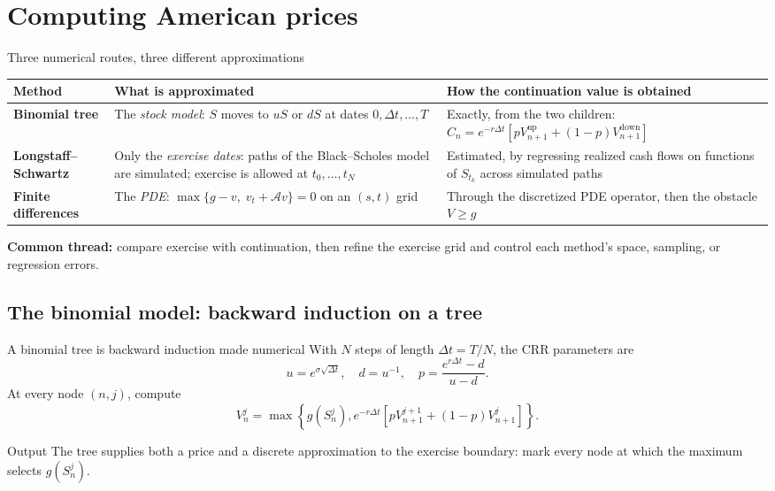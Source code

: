 \documentclass[handout,10pt,aspectratio=169]{beamer}
\begin{document}
\section{Computing American prices}

\begin{frame}{Three numerical routes, three different approximations}
\small
\begin{center}
\renewcommand{\arraystretch}{1.15}
\begin{tabular}{>{\raggedright\arraybackslash}p{}
                >{\raggedright\arraybackslash}p{}
                >{\raggedright\arraybackslash}p{}}
\toprule
Method & What is approximated & How the continuation value is obtained\\
\midrule
\textbf{Binomial tree}
  & The \emph{stock model}: \(S\) moves to \(uS\) or \(dS\) at dates
    \(0,\Delta t,\ldots,T\)
  & Exactly, from the two children:
    \(C_n=e^{-r\Delta t}[pV_{n+1}^{\mathrm{up}}+(1-p)V_{n+1}^{\mathrm{down}}]\)\\
\midrule
\textbf{Longstaff--Schwartz}
  & Only the \emph{exercise dates}: paths of the Black--Scholes model are
    simulated; exercise is allowed at \(t_0,\ldots,t_N\)
  & Estimated, by regressing realized cash flows on functions of \(S_{t_k}\)
    across simulated paths\\
\midrule
\textbf{Finite differences}
  & The \emph{PDE}: \(\max\{g-v,\;v_t+\mathcal Av\}=0\) on an \((s,t)\) grid
  & Through the discretized PDE operator, then the obstacle \(V\geq g\)\\
\bottomrule
\end{tabular}
\end{center}
\textbf{Common thread:} compare exercise with continuation, then refine
the exercise grid and control each method's space, sampling, or regression errors.
\end{frame}

\subsection{The binomial model: backward induction on a tree}

\begin{frame}{A binomial tree is backward induction made numerical}
With \(N\) steps of length \(\Delta t=T/N\), the CRR parameters are
\[
u=e^{\sigma\sqrt{\Delta t}},\quad d=u^{-1},\quad
p=\frac{e^{r\Delta t}-d}{u-d}.
\]
At every node \((n,j)\), compute
\[
\boxed{V_n^j=\max\left\{g(S_n^j),e^{-r\Delta t}
\left[pV_{n+1}^{j+1}+(1-p)V_{n+1}^j\right]\right\}.}
\]
\begin{block}{Output}
The tree supplies both a price and a discrete approximation to the exercise
boundary: mark every node at which the maximum selects \(g(S_n^j)\).
\end{block}
\end{frame}
\end{document}
